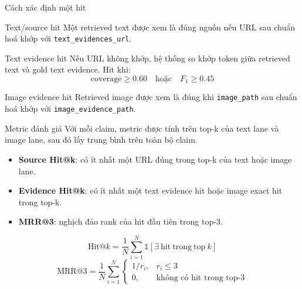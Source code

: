 \documentclass[aspectratio=169]{beamer}
\makeatletter
\newcommand{\hitk}[1]{\mathrm{Hit@}#1}
\newcommand{\mrr}{\mathrm{MRR@3}}
\makeatother
\begin{document}
\begin{frame}{Cách xác định một hit}
  \begin{block}{Text/source hit}
    Một retrieved text được xem là đúng nguồn nếu URL sau chuẩn hoá khớp với \texttt{text\_evidences\_url}.
  \end{block}

  \begin{block}{Text evidence hit}
    Nếu URL không khớp, hệ thống so khớp token giữa retrieved text và gold text evidence. Hit khi:
    \[
      \mathrm{coverage} \ge 0.60
      \quad \text{hoặc} \quad
      F_1 \ge 0.45
    \]
  \end{block}

  \begin{block}{Image evidence hit}
    Retrieved image được xem là đúng khi \texttt{image\_path} sau chuẩn hoá khớp với \texttt{image\_evidence\_path}.
  \end{block}
\end{frame}

\begin{frame}{Metric đánh giá}
  Với mỗi claim, metric được tính trên top-k của text lane và image lane, sau đó lấy trung bình trên toàn bộ claim.

  \vspace{0.2cm}
  \begin{itemize}
    \item \textbf{Source Hit@k}: có ít nhất một URL đúng trong top-k của text hoặc image lane.
    \item \textbf{Evidence Hit@k}: có ít nhất một text evidence hit hoặc image exact hit trong top-k.
    \item \textbf{MRR@3}: nghịch đảo rank của hit đầu tiên trong top-3.
  \end{itemize}

  \vspace{0.2cm}
  \[
    \hitk{k} = \frac{1}{N}\sum_{i=1}^{N}\mathbb{1}[\exists\ \mathrm{hit}\ \mathrm{trong}\ \mathrm{top}\ k]
  \]
  \[
    \mrr = \frac{1}{N}\sum_{i=1}^{N}
    \begin{cases}
      1/r_i, & r_i \le 3 \\
      0, & \text{không có hit trong top-3}
    \end{cases}
  \]
\end{frame}
\end{document}
